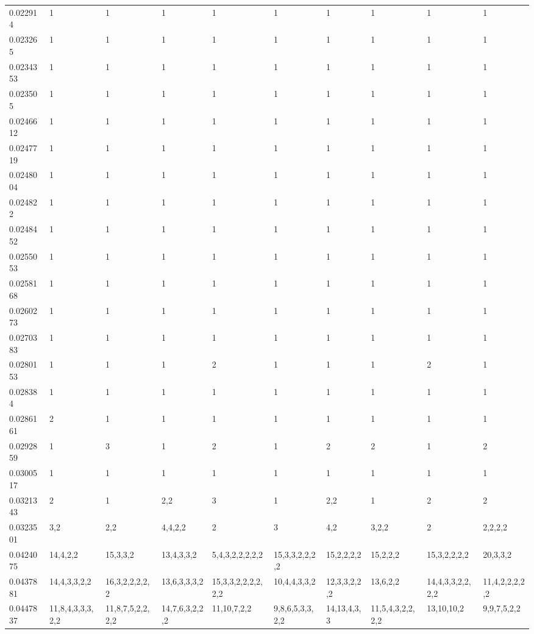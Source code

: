 \documentclass[varwidth=true, border={0, 15}]{standalone}
\begin{document}
\begin{table}[ht]
\begin{tabular}{llllllllll}
  0.022914 & 1 & 1 & 1 & 1 & 1 & 1 & 1 & 1 & 1 \\ 
  0.023265 & 1 & 1 & 1 & 1 & 1 & 1 & 1 & 1 & 1 \\ 
  0.0234353 & 1 & 1 & 1 & 1 & 1 & 1 & 1 & 1 & 1 \\ 
  0.023505 & 1 & 1 & 1 & 1 & 1 & 1 & 1 & 1 & 1 \\ 
  0.0246612 & 1 & 1 & 1 & 1 & 1 & 1 & 1 & 1 & 1 \\ 
  0.0247719 & 1 & 1 & 1 & 1 & 1 & 1 & 1 & 1 & 1 \\ 
  0.0248004 & 1 & 1 & 1 & 1 & 1 & 1 & 1 & 1 & 1 \\ 
  0.024822 & 1 & 1 & 1 & 1 & 1 & 1 & 1 & 1 & 1 \\ 
  0.0248452 & 1 & 1 & 1 & 1 & 1 & 1 & 1 & 1 & 1 \\ 
  0.0255053 & 1 & 1 & 1 & 1 & 1 & 1 & 1 & 1 & 1 \\ 
  0.0258168 & 1 & 1 & 1 & 1 & 1 & 1 & 1 & 1 & 1 \\ 
  0.0260273 & 1 & 1 & 1 & 1 & 1 & 1 & 1 & 1 & 1 \\ 
  0.0270383 & 1 & 1 & 1 & 1 & 1 & 1 & 1 & 1 & 1 \\ 
  0.0280153 & 1 & 1 & 1 & 2 & 1 & 1 & 1 & 2 & 1 \\ 
  0.028384 & 1 & 1 & 1 & 1 & 1 & 1 & 1 & 1 & 1 \\ 
  0.0286161 & 2 & 1 & 1 & 1 & 1 & 1 & 1 & 1 & 1 \\ 
  0.0292859 & 1 & 3 & 1 & 2 & 1 & 2 & 2 & 1 & 2 \\ 
  0.0300517 & 1 & 1 & 1 & 1 & 1 & 1 & 1 & 1 & 1 \\ 
  0.0321343 & 2 & 1 & 2,2 & 3 & 1 & 2,2 & 1 & 2 & 2 \\ 
  0.0323501 & 3,2 & 2,2 & 4,4,2,2 & 2 & 3 & 4,2 & 3,2,2 & 2 & 2,2,2,2 \\ 
  0.0424075 & 14,4,2,2 & 15,3,3,2 & 13,4,3,3,2 & 5,4,3,2,2,2,2,2 & 15,3,3,2,2,2,2 & 15,2,2,2,2 & 15,2,2,2 & 15,3,2,2,2,2 & 20,3,3,2 \\ 
  0.0437881 & 14,4,3,3,2,2 & 16,3,2,2,2,2,2 & 13,6,3,3,3,2 & 15,3,3,2,2,2,2,2,2 & 10,4,4,3,3,2 & 12,3,3,2,2,2 & 13,6,2,2 & 14,4,3,3,2,2,2,2 & 11,4,2,2,2,2,2 \\ 
  0.0447837 & 11,8,4,3,3,3,2,2 & 11,8,7,5,2,2,2,2 & 14,7,6,3,2,2,2 & 11,10,7,2,2 & 9,8,6,5,3,3,2,2 & 14,13,4,3,3 & 11,5,4,3,2,2,2,2 & 13,10,10,2 & 9,9,7,5,2,2 \\ 
   \hline
\end{tabular}
\end{table}
\end{document}
